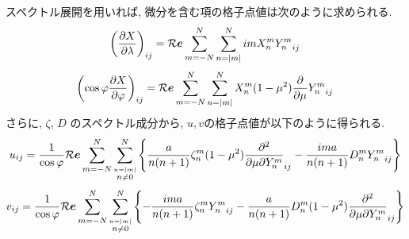スペクトル展開を用いれば,
微分を含む項の格子点値は次のように求められる.
%
\begin{equation}
   \label{気圧x}
        \left(  \frac{\partial X}{\partial \lambda} \right)_{ij}
     =  
        {\cal R}\Dvect{e} \sum_{m=-N}^{N} \sum_{n=|m|}^{N} 
       im X_n^m {Y_n^m}_{ij}
\end{equation}
%
\begin{equation}
   \label{気圧y}
   \left( \cos\varphi \frac{\partial X}{\partial \varphi} \right)_{ij}
     =  {\cal R}\Dvect{e} \sum_{m=-N}^{N} \sum_{n=|m|}^{N} 
       X_n^m 
       ( 1-\mu^{2} ) \frac{\partial }{\partial \mu} {Y_n^m}_{ij}
\end{equation}
%
さらに,
$\zeta$, $D$ のスペクトル成分から, 
$u,v$の格子点値が以下のように得られる.
%
\begin{equation}
  \label{Uを求める}
  u_{ij}
  = \frac{1}{\cos\varphi}
     {\cal R}\Dvect{e} \sum_{m=-N}^{N} 
                       \sum_{\stackrel{n=|m|}{n \neq 0}}^{N} 
    \left\{
             \frac{a}{n(n+1)} \zeta_n^m 
            (1-\mu^{2}) \DP{}{\mu} {Y_n^m}_{ij}
          -  \frac{im a}{n(n+1)} D_n^m {Y_n^m}_{ij}
    \right\}
\end{equation}
%
\begin{equation}
  \label{Vを求める}
  v_{ij}
  = \frac{1}{\cos\varphi}
   {\cal R}\Dvect{e} \sum_{m=-N}^{N}
                     \sum_{\stackrel{n=|m|}{n \neq 0}}^{N}
    \left\{
          -  \frac{im a}{n(n+1)} \zeta_n^m {Y_n^m}_{ij}
          -  \frac{a}{n(n+1)} D_n^m 
            (1-\mu^{2}) \DP{}{\mu} {Y_n^m}_{ij}
    \right\}
\end{equation}

